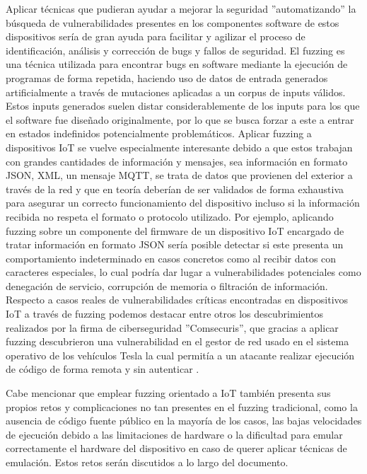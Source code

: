 Aplicar técnicas que pudieran ayudar a mejorar la seguridad ''automatizando'' la búsqueda de vulnerabilidades presentes en los componentes software 
de estos dispositivos sería de gran ayuda para facilitar y agilizar el proceso de identificación, análisis y corrección 
de bugs y fallos de seguridad. El fuzzing es una técnica utilizada para encontrar bugs en software mediante la ejecución de 
programas de forma repetida, haciendo uso de datos de entrada generados artificialmente a través de mutaciones aplicadas a un
corpus de inputs válidos. Estos inputs generados suelen distar considerablemente de los inputs para los que el software fue diseñado 
originalmente, por lo que se busca forzar a este a entrar en estados indefinidos potencialmente problemáticos. Aplicar
fuzzing a dispositivos IoT se vuelve especialmente interesante debido a que estos trabajan con grandes cantidades de información y mensajes,
sea información en formato JSON, XML, un mensaje MQTT, se trata de datos que provienen del exterior a través de la red y que en teoría deberían de ser validados 
de forma exhaustiva para asegurar un correcto funcionamiento del dispositivo incluso si la información recibida no respeta el formato o protocolo 
utilizado. Por ejemplo, aplicando fuzzing sobre un componente del firmware de un dispositivo IoT encargado de tratar información en formato JSON
sería posible detectar si este presenta un comportamiento indeterminado en casos concretos como al recibir datos con caracteres especiales, lo cual
podría dar lugar a vulnerabilidades potenciales como denegación de servicio, corrupción de memoria o filtración de información. Respecto a casos reales
de vulnerabilidades críticas encontradas en dispositivos IoT a través de fuzzing podemos destacar entre otros los descubrimientos realizados por la firma 
de ciberseguridad ''Comsecuris'', que gracias a aplicar fuzzing descubrieron una vulnerabilidad en el gestor de red usado en el 
sistema operativo de los vehículos Tesla la cual permitía a un atacante realizar ejecución de código de forma remota y sin autenticar \cite{TeslaMCU}.\bigskip

Cabe mencionar que emplear fuzzing orientado a IoT también presenta sus propios retos y complicaciones no tan presentes en el fuzzing tradicional, como la ausencia de código fuente público en la mayoría de los casos, las bajas velocidades de ejecución debido a las limitaciones de hardware o la dificultad para emular correctamente el hardware del dispositivo en caso de querer aplicar técnicas de emulación. Estos retos serán discutidos a lo largo del documento.\bigskip

